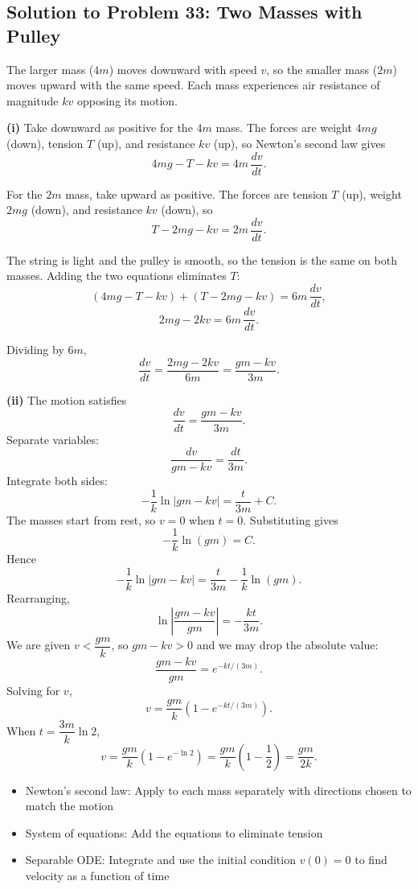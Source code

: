 \subsection{Solution to Problem 33: Two Masses with Pulley}

\begin{solution}
The larger mass ($4m$) moves downward with speed $v$, so the smaller mass ($2m$) moves upward with the same speed. Each mass experiences air resistance of magnitude $kv$ opposing its motion.

\textbf{(i)} Take downward as positive for the $4m$ mass. The forces are weight $4mg$ (down), tension $T$ (up), and resistance $kv$ (up), so Newton's second law gives
\[
4mg - T - kv = 4m\,\frac{dv}{dt}.
\]

For the $2m$ mass, take upward as positive. The forces are tension $T$ (up), weight $2mg$ (down), and resistance $kv$ (down), so
\[
T - 2mg - kv = 2m\,\frac{dv}{dt}.
\]

The string is light and the pulley is smooth, so the tension is the same on both masses. Adding the two equations eliminates $T$:
\[
(4mg - T - kv) + (T - 2mg - kv) = 6m\,\frac{dv}{dt},
\]
\[
2mg - 2kv = 6m\,\frac{dv}{dt}.
\]

Dividing by $6m$,
\[
\frac{dv}{dt} = \frac{2mg - 2kv}{6m} = \frac{gm - kv}{3m}.
\]

\textbf{(ii)} The motion satisfies
\[
\frac{dv}{dt} = \frac{gm - kv}{3m}.
\]
Separate variables:
\[
\frac{dv}{gm - kv} = \frac{dt}{3m}.
\]
Integrate both sides:
\[
-\frac{1}{k}\ln|gm - kv| = \frac{t}{3m} + C.
\]
The masses start from rest, so $v = 0$ when $t = 0$. Substituting gives
\[
-\frac{1}{k}\ln(gm) = C.
\]
Hence
\[
-\frac{1}{k}\ln|gm - kv| = \frac{t}{3m} - \frac{1}{k}\ln(gm).
\]
Rearranging,
\[
\ln\left|\frac{gm - kv}{gm}\right| = -\frac{kt}{3m}.
\]
We are given $v < \dfrac{gm}{k}$, so $gm - kv > 0$ and we may drop the absolute value:
\[
\frac{gm - kv}{gm} = e^{-kt/(3m)}.
\]
Solving for $v$,
\[
v = \frac{gm}{k}\left(1 - e^{-kt/(3m)}\right).
\]
When $t = \dfrac{3m}{k}\ln 2$,
\[
v = \frac{gm}{k}\left(1 - e^{-\ln 2}\right)
= \frac{gm}{k}\left(1 - \frac{1}{2}\right)
= \frac{gm}{2k}.
\]
\end{solution}

\begin{takeaways}
\begin{itemize}
    \item Newton's second law: Apply to each mass separately with directions chosen to match the motion
    \item System of equations: Add the equations to eliminate tension
    \item Separable ODE: Integrate and use the initial condition $v(0) = 0$ to find velocity as a function of time
\end{itemize}
\end{takeaways}

